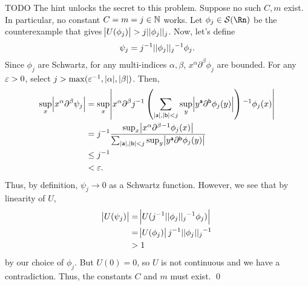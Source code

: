 \documentclass{article}
\renewcommand{\d}{\partial}
\begin{document}
\newpage
{} TODO
 \tri
\hop 
\solution
The hint unlocks the secret to this problem. Suppose no such $C, m$ exist. In particular, no constant $C = m = j \in \mathbb{N}$ works. Let $\phi_j \in \cal{S}(\Rn)$ be the counterexample that gives $\abs{U(\phi_j)} > j||\phi_j||_j$. Now, let's define 
\[\psi_j = j{^{-1}}||\phi_j||_j{^{-1}}\phi_j.\]
Since $\phi_j$ are Schwartz, for any multi-indices $\alpha, \beta$,  $x^\alpha \d^\beta \phi_j$ are bounded. For any $\varepsilon > 0$, select $j > \max(\varepsilon {^{-1}}, |\alpha| , |\beta|)$. Then, 
\begin{align*}
    \sup_x\abs{x^\alpha \d^\beta \psi_j} &= \sup_x \abs{x^\alpha \d^\beta j\inv \del{\sum_{|{\sf{a}}|, |{\sf{b}}| < j} \sup_{y} \abs{y^{\sf a} \d^{\sf b} \phi_j(y)}}\inv \phi_j(x)}\\
    &= j\inv \frac{ \sup_x \abs{x^\alpha \d^\beta \inv \phi_j(x)}}{\sum_{|{\sf{a}}|, |{\sf{b}}| < j} \sup_{y} \abs{y^{\sf a} \d^{\sf b} \phi_j(y)}} \\
    &\le j\inv \\
    &< \eps.
\end{align*}
Thus, by definition, $\psi_j \to 0$ as a Schwartz function. 
\hop 
However, we see that by linearity of $U$, 
\begin{align*}
    \abs{U(\psi_j)} &= \abs{U(j{^{-1}}||\phi_j||_j{^{-1}}\phi_j)}\\
    &= \abs{U(\phi_j)}j{^{-1}}||\phi_j||_j{^{-1}} \\
    &> 1
\end{align*}
by our choice of $\phi_j$. But $U(0)=0$, so $U$ is not continuous and we have a contradiction. Thus, 
the constants $C$ and $m$ must exist. \qed 
\end{document}
